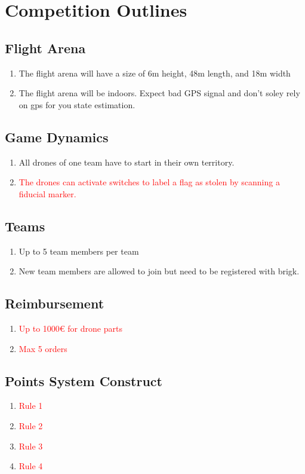 \section{Competition Outlines}

\subsection{Flight Arena}
\begin{enumerate}
	\item{The flight arena will have a size of 6m height, 48m length, and 18m width}
	\item{The flight arena will be indoors. Expect bad GPS signal and don't soley rely on gps for you state estimation.}
\end{enumerate}

\subsection{Game Dynamics}
\begin{enumerate}
	\item{All drones of one team have to start in their own territory.}
	\item{\textcolor{red}{The drones can activate switches to label a flag as stolen by scanning a fiducial marker.}}
\end{enumerate}

\subsection{Teams}
\begin{enumerate}
	\item{Up to 5 team members per team}
	\item{New team members are allowed to join but need to be registered with brigk.}
\end{enumerate}

\subsection{Reimbursement}
\begin{enumerate}
	\item{\textcolor{red}{Up to 1000€ for drone parts}}
	\item{\textcolor{red}{Max 5 orders}}
\end{enumerate}

\subsection{Points System Construct}
\begin{enumerate}
	\item{\textcolor{red}{Rule 1}}
	\item{\textcolor{red}{Rule 2}}
	\item{\textcolor{red}{Rule 3}}
	\item{\textcolor{red}{Rule 4}}
\end{enumerate}

